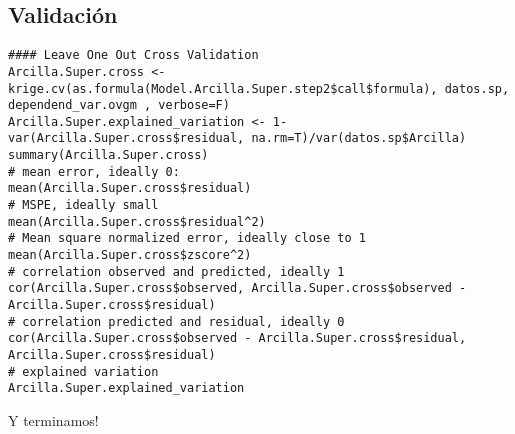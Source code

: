 \documentclass[10pt,a4paper]{article}
\begin{document}
\subsection{Validación}
\begin{lstlisting}
#### Leave One Out Cross Validation
Arcilla.Super.cross <- krige.cv(as.formula(Model.Arcilla.Super.step2$call$formula), datos.sp, dependend_var.ovgm , verbose=F)
Arcilla.Super.explained_variation <- 1-var(Arcilla.Super.cross$residual, na.rm=T)/var(datos.sp$Arcilla)
summary(Arcilla.Super.cross)
# mean error, ideally 0:
mean(Arcilla.Super.cross$residual)
# MSPE, ideally small
mean(Arcilla.Super.cross$residual^2)
# Mean square normalized error, ideally close to 1
mean(Arcilla.Super.cross$zscore^2)
# correlation observed and predicted, ideally 1
cor(Arcilla.Super.cross$observed, Arcilla.Super.cross$observed - Arcilla.Super.cross$residual)
# correlation predicted and residual, ideally 0
cor(Arcilla.Super.cross$observed - Arcilla.Super.cross$residual, Arcilla.Super.cross$residual)
# explained variation
Arcilla.Super.explained_variation
\end{lstlisting}

Y terminamos!
  

\end{document}
